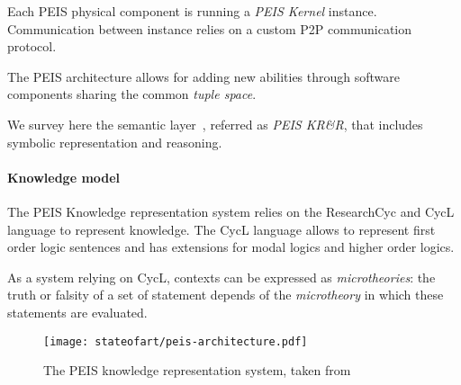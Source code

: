 Each PEIS physical component is running a \emph{PEIS Kernel} instance. Communication
between instance relies on a custom P2P communication protocol.

The PEIS architecture allows for adding new abilities through software components sharing the common \emph{tuple space}.

We survey here the semantic layer~\cite{Daoutis2009}, referred as \emph{PEIS KR\&R}, that includes symbolic representation and reasoning.


\paragraph{Knowledge model} The PEIS Knowledge representation system relies on
the {\sc ResearchCyc} and {\sc CycL} language to represent knowledge. The {\sc CycL} language
allows to represent first order logic sentences and has extensions for modal logics and higher order logics.


As a system relying on {\sc CycL}, contexts can be expressed as
\emph{microtheories}: the truth or falsity of a set of statement depends of the
\emph{microtheory} in which these statements are evaluated.


\begin{figure}
	\centering
	\texttt{[image: stateofart/peis-architecture.pdf]}
	\caption{The PEIS knowledge representation system, taken from~\cite{Daoutis2009}}
	\label{fig|peis-archi}
\end{figure}

